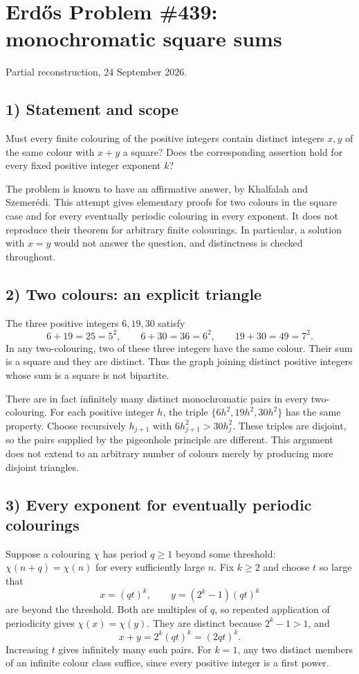 \section{Erd\H{o}s Problem \#439: monochromatic square sums}
\noindent Partial reconstruction, 24 September 2026.

\subsection*{1) Statement and scope}
Must every finite colouring of the positive integers contain distinct integers $x,y$ of the same colour with $x+y$ a square? Does the corresponding assertion hold for every fixed positive integer exponent $k$?

The problem is known to have an affirmative answer, by Khalfalah and Szemer\'edi. This attempt gives elementary proofs for two colours in the square case and for every eventually periodic colouring in every exponent. It does not reproduce their theorem for arbitrary finite colourings. In particular, a solution with $x=y$ would not answer the question, and distinctness is checked throughout.

\subsection*{2) Two colours: an explicit triangle}
The three positive integers $6,19,30$ satisfy
\[
6+19=25=5^2,\qquad 6+30=36=6^2,\qquad19+30=49=7^2.
\]
In any two-colouring, two of these three integers have the same colour. Their sum is a square and they are distinct. Thus the graph joining distinct positive integers whose sum is a square is not bipartite.

There are in fact infinitely many distinct monochromatic pairs in every two-colouring. For each positive integer $h$, the triple $\{6h^2,19h^2,30h^2\}$ has the same property. Choose recursively $h_{j+1}$ with $6h_{j+1}^2>30h_j^2$. These triples are disjoint, so the pairs supplied by the pigeonhole principle are different. This argument does not extend to an arbitrary number of colours merely by producing more disjoint triangles.

\subsection*{3) Every exponent for eventually periodic colourings}
Suppose a colouring $\chi$ has period $q\ge1$ beyond some threshold: $\chi(n+q)=\chi(n)$ for every sufficiently large $n$. Fix $k\ge2$ and choose $t$ so large that
\[
x=(qt)^k,\qquad y=(2^k-1)(qt)^k
\]
are beyond the threshold. Both are multiples of $q$, so repeated application of periodicity gives $\chi(x)=\chi(y)$. They are distinct because $2^k-1>1$, and
\[x+y=2^k(qt)^k=(2qt)^k.\]
Increasing $t$ gives infinitely many such pairs. For $k=1$, any two distinct members of an infinite colour class suffice, since every positive integer is a first power.

